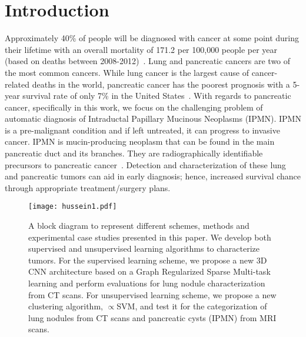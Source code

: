 \documentclass[journal]{IEEEtran}
\begin{document}
\section{Introduction}
Approximately 40\% of people will be diagnosed with cancer at some point during their lifetime with an overall mortality of 171.2 per 100,000 people per year (based on deaths between 2008-2012)~\cite{americancancer}. Lung and pancreatic cancers are two of the most common cancers. While lung cancer is the largest cause of cancer-related deaths in the world, pancreatic cancer has the poorest prognosis with a 5-year survival rate of only 7\% in the United States~\cite{americancancer}. %
With regards to pancreatic cancer, specifically in this work, we focus on the challenging problem of automatic diagnosis of Intraductal Papillary Mucinous Neoplasms (IPMN). IPMN is a pre-malignant condition and if left untreated, it can progress to invasive cancer. IPMN is mucin-producing neoplasm that can be found in the main pancreatic duct and its branches. They are radiographically identifiable precursors to pancreatic cancer~\cite{sadot2015tumor}. %
Detection and characterization of these lung and pancreatic tumors can aid in early diagnosis; hence, increased survival chance through appropriate treatment/surgery plans. 

\begin{figure}[t]
\centering
\texttt{[image: hussein1.pdf]}
\caption{A block diagram to represent different schemes, methods and experimental case studies presented in this paper. We develop both  supervised and unsupervised learning algorithms to characterize tumors. For the supervised learning scheme, we propose a new  3D CNN architecture based on a Graph Regularized Sparse Multi-task learning and perform evaluations for lung nodule characterization from CT scans. For unsupervised learning scheme, we propose a new clustering algorithm, $\propto$SVM, and test it for the categorization of lung nodules from CT scans and pancreatic cysts (IPMN) from MRI scans.}
\label{fig:blockdiag}
\end{figure}
\end{document}
